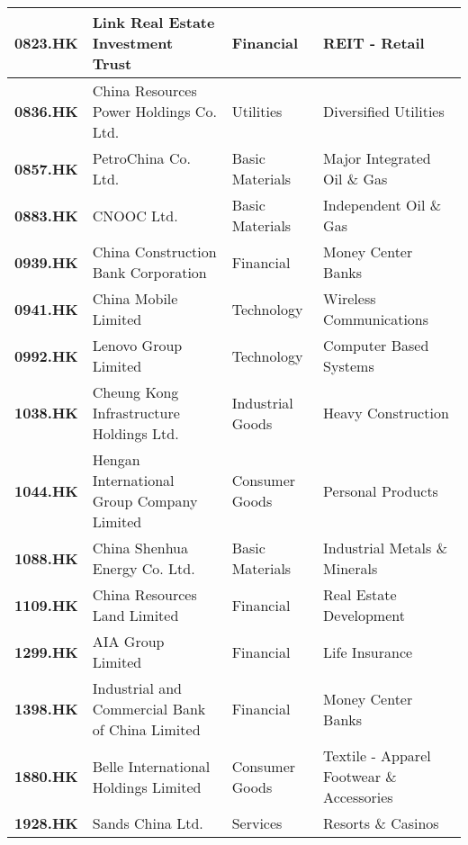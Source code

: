 \begin{table}[h]
{\begin{tabular}{|l|l|l|l|}
			\textbf{0823.HK} & Link Real Estate Investment Trust                & Financial        & REIT - Retail                             \\ \hline
			\textbf{0836.HK} & China Resources Power Holdings Co. Ltd.          & Utilities        & Diversified Utilities                     \\ \hline
			\textbf{0857.HK} & PetroChina Co. Ltd.                              & Basic Materials  & Major Integrated Oil \& Gas               \\ \hline
			\textbf{0883.HK} & CNOOC Ltd.                                       & Basic Materials  & Independent Oil \& Gas                    \\ \hline
			\textbf{0939.HK} & China Construction Bank Corporation              & Financial        & Money Center Banks                        \\ \hline
			\textbf{0941.HK} & China Mobile Limited                             & Technology       & Wireless Communications                   \\ \hline
			\textbf{0992.HK} & Lenovo Group Limited                             & Technology       & Computer Based Systems                    \\ \hline
			\textbf{1038.HK} & Cheung Kong Infrastructure Holdings Ltd.         & Industrial Goods & Heavy Construction                        \\ \hline
			\textbf{1044.HK} & Hengan International Group Company Limited       & Consumer Goods   & Personal Products                         \\ \hline
			\textbf{1088.HK} & China Shenhua Energy Co. Ltd.                    & Basic Materials  & Industrial Metals \& Minerals             \\ \hline
			\textbf{1109.HK} & China Resources Land Limited                     & Financial        & Real Estate Development                   \\ \hline
			\textbf{1299.HK} & AIA Group Limited                                & Financial        & Life Insurance                            \\ \hline
			\textbf{1398.HK} & Industrial and Commercial Bank of China Limited  & Financial        & Money Center Banks                        \\ \hline
			\textbf{1880.HK} & Belle International Holdings Limited             & Consumer Goods   & Textile - Apparel Footwear \& Accessories \\ \hline
			\textbf{1928.HK} & Sands China Ltd.                                 & Services         & Resorts \& Casinos                        \\ \hline

\end{tabular}}
\end{table}
